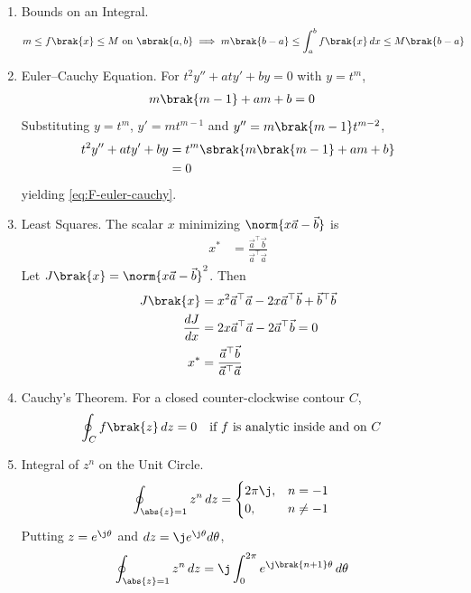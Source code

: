\begin{enumerate}[label=\thesubsection.\arabic*, ref=\thesubsection.\theenumi]
\item Bounds on an Integral.
\begin{align}
m \le f\brak{x} \le M \text{ on } \sbrak{a, b} &\implies m\brak{b - a} \le \int_{a}^{b} f\brak{x} \,dx \le M\brak{b - a}
\label{eq:F-intbound}
\end{align}
\item Euler--Cauchy Equation. For $t^2 y'' + a t y' + b y = 0$ with $y = t^m$,
\begin{align}
m\brak{m - 1} + a m + b &= 0
\label{eq:F-euler-cauchy}
\end{align}
\solution Substituting $y = t^m$, $y' = m t^{m-1}$ and $y'' = m\brak{m-1}t^{m-2}$,
\begin{align}
t^2 y'' + a t y' + b y &= t^m \sbrak{m\brak{m - 1} + a m + b}
\\
&= 0
\end{align}
yielding \eqref{eq:F-euler-cauchy}.
\item Least Squares.
The scalar $x$ minimizing $\norm{x\vec{a} - \vec{b}}$ is
\begin{align}
x^* &= \frac{\vec{a}^\top \vec{b}}{\vec{a}^\top \vec{a}}
\label{eq:F-ls}
\end{align}
\solution Let $J\brak{x} = \norm{x\vec{a} - \vec{b}}^2$. Then
\begin{align}
J\brak{x} &= x^2 \vec{a}^\top \vec{a} - 2x \vec{a}^\top \vec{b} + \vec{b}^\top \vec{b}
\\
\frac{dJ}{dx} &= 2x \vec{a}^\top \vec{a} - 2\vec{a}^\top \vec{b} = 0
\\
x^* &= \frac{\vec{a}^\top \vec{b}}{\vec{a}^\top \vec{a}}
\end{align}
\item Cauchy's Theorem. For a closed counter-clockwise contour $C$,
\begin{align}
\oint_{C} f\brak{z} \,dz &= 0 \quad \text{if } f \text{ is analytic inside and on } C
\label{eq:F-cauchy}
\end{align}
\item Integral of $z^n$ on the Unit Circle.
\begin{align}
\oint_{\abs{z} = 1} z^n \,dz &= \begin{cases} 2\pi \j, & n = -1 \\ 0, & n \ne -1 \end{cases}
\label{eq:F-zn}
\end{align}
\solution Putting $z = e^{\j \theta}$ and $dz = \j e^{\j \theta} d\theta$,
\begin{align}
\oint_{\abs{z} = 1} z^n \,dz &= \j \int_{0}^{2\pi} e^{\j \brak{n + 1}\theta} \,d\theta

\end{align}
\end{enumerate}
